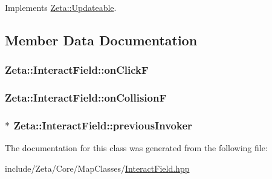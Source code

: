 Implements \hyperlink{classZeta_1_1Updateable_af4006bfccb762454b4da08786ad93de0}{Zeta\+::\+Updateable}.



\subsection{Member Data Documentation}
\hypertarget{classZeta_1_1InteractField_aa3a858d6a7029cb3dc72c70797f610c7}{
\subsubsection[{on\+Click\+F}]{ Zeta\+::\+Interact\+Field\+::on\+Click\+F\hspace{0.3cm}{\ttfamily [private]}}}\label{classZeta_1_1InteractField_aa3a858d6a7029cb3dc72c70797f610c7}
\hypertarget{classZeta_1_1InteractField_a7c1f68e96ceef6bc5afdb2640f8e19fc}{
\subsubsection[{on\+Collision\+F}]{ Zeta\+::\+Interact\+Field\+::on\+Collision\+F\hspace{0.3cm}{\ttfamily [private]}}}\label{classZeta_1_1InteractField_a7c1f68e96ceef6bc5afdb2640f8e19fc}
\hypertarget{classZeta_1_1InteractField_a5adb02a1c196e8f715cd63fc2bd9cad2}{
\subsubsection[{previous\+Invoker}]{$\ast$ Zeta\+::\+Interact\+Field\+::previous\+Invoker\hspace{0.3cm}{\ttfamily [private]}}}\label{classZeta_1_1InteractField_a5adb02a1c196e8f715cd63fc2bd9cad2}


The documentation for this class was generated from the following file\+:\begin{DoxyCompactItemize}
\item 
include/\+Zeta/\+Core/\+Map\+Classes/\hyperlink{InteractField_8hpp}{Interact\+Field.\+hpp}\end{DoxyCompactItemize}
